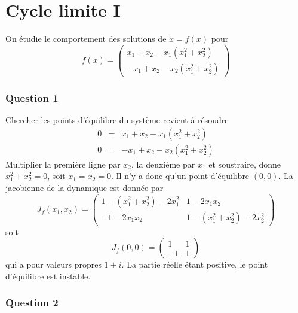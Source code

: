 \hypertarget{correc_cycle_lim}{%
\section{Cycle limite I}\label{correc_cycle_lim}}

On étudie le comportement des solutions de \(\dot{x}=f(x)\) pour \[
f(x) = 
\left(
\begin{array}{c}
x_1+x_2-x_1(x_1^2+x_2^2) \\
-x_1+x_2-x_2(x_1^2+x_2^2) 
\end{array}
\right)
\]

\hypertarget{answer-cycle-lim-1}{%
\subsubsection*{Question 1}\label{answer-cycle-lim-1}}


Chercher les points d'équilibre du système revient à résoudre \[
\begin{array}{rcl}
0&=& x_1+x_2-x_1(x_1^2+x_2^2) \\
0&=& -x_1+x_2-x_2(x_1^2+x_2^2) 
\end{array}
\] Multiplier la première ligne par \(x_2\), la deuxième par \(x_1\) et
soustraire, donne \(x_1^2+x_2^2=0\), soit \(x_1=x_2=0\). Il n'y a donc
qu'un point d'équilibre \((0,0)\). La jacobienne de la dynamique est
donnée par \[
J_f(x_1,x_2) = 
\left(
\begin{matrix}
1-(x_1^2+x_2^2) -2 x_1^2 & 1-2 x_1x_2 \\
-1-2 x_1x_2 & 1-(x_1^2+x_2^2)-2 x_2^2
\end{matrix}
\right)
\] soit \[
J_f(0,0) = 
\left(
\begin{matrix}
1  & 1 \\
-1 & 1
\end{matrix}
\right)
\] qui a pour valeurs propres \(1\pm i\). La partie réelle étant
positive, le point d'équilibre est instable.

\hypertarget{answer-cycle-lim-2}{%
\subsubsection*{Question 2}\label{answer-cycle-lim-2}}


